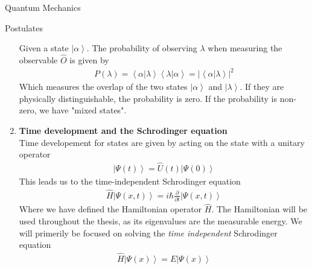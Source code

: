 \documentclass[twoside,english]{uiofysmaster}
\begin{document}
\begin{chapter}{Quantum Mechanics}
\begin{section}{Postulates}
\begin{enumerate}
 			Given a state $\left| \alpha \right>$. The probability of observing $\lambda$ when measuring the observable $\hat O$ is given by 
 			\begin{align}
 				P(\lambda) = \left< \alpha | \lambda \right> \left< \lambda | \alpha \right> = | \left< \alpha | \lambda \right> |^2 
 			\end{align}
 			Which measures the overlap of the two states $\left| \alpha \right>$ and $\left| \lambda \right>$. If they are physically distinguishable, the probability is zero. If the probability is non-zero, we have "mixed states".
 			\item \textbf{Time development and the Schrodinger equation}\\
 			Time developement for states are given by acting on the state with a unitary operator
 			\begin{align}
 				\left| \Psi(t) \right> = \hat U(t) \left| \Psi(0) \right>
 			\end{align}
 			This leads us to the time-independent Schrodinger equation
 			\begin{align}
 				\hat H \left| \Psi(x,t) \right> = i \hbar \frac{\partial}{\partial t} \left| \Psi(x,t) \right> 
 			\end{align}
 			Where we have defined the Hamiltonian operator $\hat H$. The Hamiltonian will be used throughout the thesis, as its eigenvalues are the measurable energy. We will primerily be focused on solving the \textit{time independent} Schrodinger equation
 			\begin{align}
 				\hat H \left| \Psi(x) \right> = E \left| \Psi(x) \right> 
 			\end{align} 
 		\end{enumerate}
 	\end{section}


\end{chapter}
\end{document}
